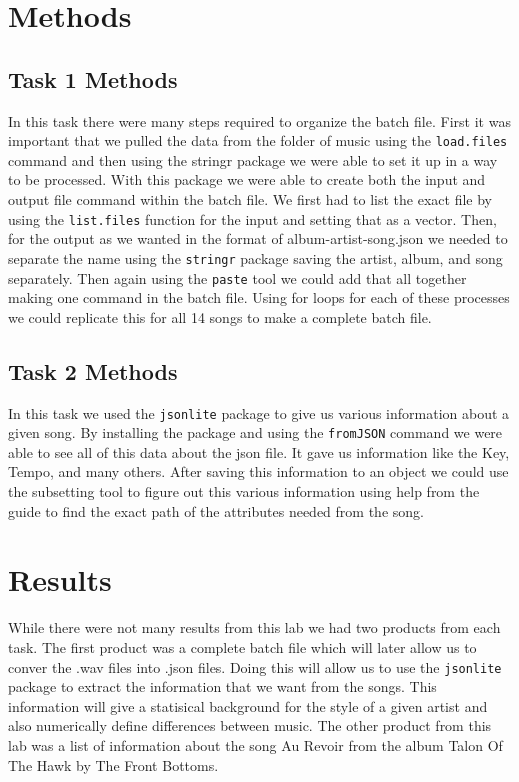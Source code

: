 \documentclass{article}\usepackage[]{graphicx}\usepackage[]{xcolor}
\begin{document}
\begin{multicols}{2}
\section{Methods}


\subsection{Task 1 Methods}
In this task there were many steps required to organize the batch file. First it was important that we pulled the data from the folder of music using the \texttt{load.files} command and then using the stringr package we were able to set it up in a way to be processed. \citep{stringr} With this package we were able to create both the input and output file command within the batch file. We first had to list the exact file by using the \texttt{list.files} function for the input and setting that as a vector. Then, for the output as we wanted in the format of album-artist-song.json we needed to separate the name using the \texttt{stringr} package saving the artist, album, and song separately. Then again using the \texttt{paste} tool we could add that all together making one command in the batch file. Using for loops for each of these processes we could replicate this for all 14 songs to make a complete batch file. 
\subsection{Task 2 Methods}
In this task we used the \texttt{jsonlite} package to give us various information about a given song. By installing the package and using the \texttt{fromJSON} command we were able to see all of this data about the json file. It gave us information like the Key, Tempo, and many others. After saving this information to an object we could use the subsetting tool to figure out this various information using help from the guide to find the exact path of the attributes needed from the song. 

\section{Results}
While there were not many results from this lab we had two products from each task. The first product was a complete batch file which will later allow us to conver the .wav files into .json files. Doing this will allow us to use the \texttt{jsonlite} package to extract the information that we want from the songs. This information will give a statisical background for the style of a given artist and also numerically define differences between music. The other product from this lab was a list of information about the song Au Revoir from the album Talon Of The Hawk by The Front Bottoms. 



\end{multicols}
\end{document}
